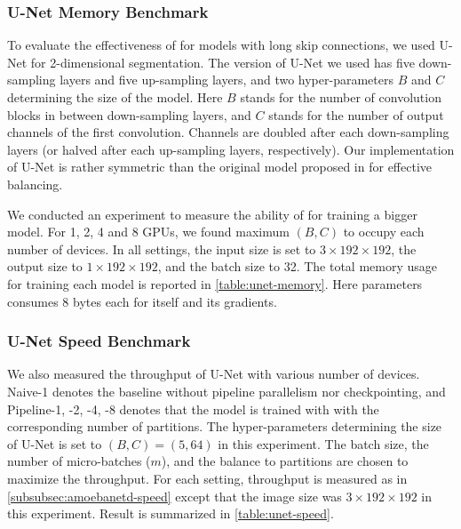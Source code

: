 \subsubsection{U-Net Memory Benchmark}
\label{subsubsec:unet-memory}

To evaluate the effectiveness of {\torchgpipe} for models with long skip connections, we used U-Net \cite{RonnebergerFB15} for 2-dimensional segmentation. The version of U-Net we used has five down-sampling layers and five up-sampling layers, and two hyper-parameters $B$ and $C$ determining the size of the model. Here $B$ stands for the number of convolution blocks in between down-sampling layers, and $C$ stands for the number of output channels of the first convolution. Channels are doubled after each down-sampling layers (or halved after each up-sampling layers, respectively). Our implementation of U-Net is rather symmetric than the original model proposed in \cite{RonnebergerFB15} for effective balancing.

We conducted an experiment to measure the ability of {\torchgpipe} for training a bigger model. For 1, 2, 4 and 8 GPUs, we found maximum $(B, C)$ to occupy each number of devices. In all settings, the input size is set to $3 \times 192 \times 192$, the output size to $1 \times 192 \times 192$, and the batch size to 32. The total memory usage for training each model is reported in \autoref{table:unet-memory}. Here parameters consumes 8 bytes each for itself and its gradients.

\subsubsection{U-Net Speed Benchmark}
\label{subsubsec:unet-speed}
We also measured the throughput of U-Net with various number of devices. Naive-1 denotes the baseline without pipeline parallelism nor checkpointing, and Pipeline-1, -2, -4, -8 denotes that the model is trained with {\torchgpipe} with the corresponding number of partitions. The hyper-parameters determining the size of U-Net is set to $(B, C) = (5, 64)$ in this experiment. The batch size, the number of micro-batches ($m$), and the balance to partitions are chosen to maximize the throughput. For each setting, throughput is measured as in \autoref{subsubsec:amoebanetd-speed} except that the image size was $3 \times 192 \times 192$ in this experiment. Result is summarized in \autoref{table:unet-speed}.


